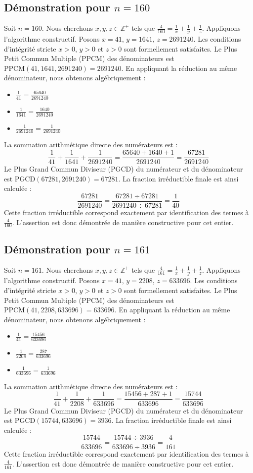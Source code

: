 \documentclass[11pt,a4paper]{article}
\begin{document}
\subsection{Démonstration pour $n = 160$}
Soit $n = 160$. Nous cherchons $x, y, z \in \mathbb{Z}^{+}$ tels que $\frac{4}{160} = \frac{1}{x} + \frac{1}{y} + \frac{1}{z}$.
Appliquons l'algorithme constructif. Posons $x = 41$, $y = 1641$, $z = 2691240$.
Les conditions d'intégrité stricte $x > 0$, $y > 0$ et $z > 0$ sont formellement satisfaites.
Le Plus Petit Commun Multiple (PPCM) des dénominateurs est $\text{PPCM}(41, 1641, 2691240) = 2691240$.
En appliquant la réduction au même dénominateur, nous obtenons algébriquement :
\begin{itemize}
    \item $\frac{1}{41} = \frac{65640}{2691240}$
    \item $\frac{1}{1641} = \frac{1640}{2691240}$
    \item $\frac{1}{2691240} = \frac{1}{2691240}$
\end{itemize}
La sommation arithmétique directe des numérateurs est :
$$ \frac{1}{41} + \frac{1}{1641} + \frac{1}{2691240} = \frac{65640 + 1640 + 1}{2691240} = \frac{67281}{2691240} $$
Le Plus Grand Commun Diviseur (PGCD) du numérateur et du dénominateur est $\text{PGCD}(67281, 2691240) = 67281$.
La fraction irréductible finale est ainsi calculée :
$$ \frac{67281}{2691240} = \frac{67281 \div 67281}{2691240 \div 67281} = \frac{1}{40} $$
Cette fraction irréductible correspond exactement par identification des termes à $\frac{4}{160}$. L'assertion est donc démontrée de manière constructive pour cet entier.

\subsection{Démonstration pour $n = 161$}
Soit $n = 161$. Nous cherchons $x, y, z \in \mathbb{Z}^{+}$ tels que $\frac{4}{161} = \frac{1}{x} + \frac{1}{y} + \frac{1}{z}$.
Appliquons l'algorithme constructif. Posons $x = 41$, $y = 2208$, $z = 633696$.
Les conditions d'intégrité stricte $x > 0$, $y > 0$ et $z > 0$ sont formellement satisfaites.
Le Plus Petit Commun Multiple (PPCM) des dénominateurs est $\text{PPCM}(41, 2208, 633696) = 633696$.
En appliquant la réduction au même dénominateur, nous obtenons algébriquement :
\begin{itemize}
    \item $\frac{1}{41} = \frac{15456}{633696}$
    \item $\frac{1}{2208} = \frac{287}{633696}$
    \item $\frac{1}{633696} = \frac{1}{633696}$
\end{itemize}
La sommation arithmétique directe des numérateurs est :
$$ \frac{1}{41} + \frac{1}{2208} + \frac{1}{633696} = \frac{15456 + 287 + 1}{633696} = \frac{15744}{633696} $$
Le Plus Grand Commun Diviseur (PGCD) du numérateur et du dénominateur est $\text{PGCD}(15744, 633696) = 3936$.
La fraction irréductible finale est ainsi calculée :
$$ \frac{15744}{633696} = \frac{15744 \div 3936}{633696 \div 3936} = \frac{4}{161} $$
Cette fraction irréductible correspond exactement par identification des termes à $\frac{4}{161}$. L'assertion est donc démontrée de manière constructive pour cet entier.
\end{document}

